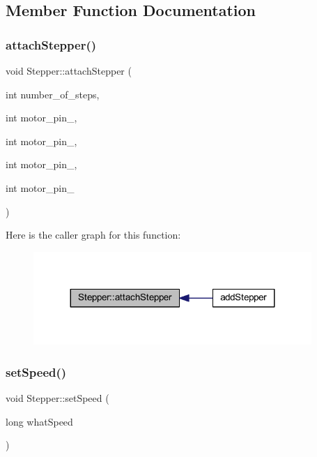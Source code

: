 \subsection{Member Function Documentation}
\mbox{\label{class_stepper_a3f68ee9b26d4076133ebfe070ec0b37c}} 
\subsubsection{\texorpdfstring{attach\+Stepper()}{attachStepper()}}
{\footnotesize\ttfamily void Stepper\+::attach\+Stepper (\begin{DoxyParamCaption}\item[{int}]{number\+\_\+of\+\_\+steps,  }\item[{int}]{motor\+\_\+pin\+\_,  }\item[{int}]{motor\+\_\+pin\+\_,  }\item[{int}]{motor\+\_\+pin\+\_,  }\item[{int}]{motor\+\_\+pin\+\_ }\end{DoxyParamCaption})}

Here is the caller graph for this function\+:\nopagebreak
\begin{figure}[H]
\begin{center}
\leavevmode
\includegraphics[width=299pt]{class_stepper_a3f68ee9b26d4076133ebfe070ec0b37c_icgraph}
\end{center}
\end{figure}
\mbox{\label{class_stepper_a89a1f8b30656437bba8732721d5671e2}} 
\subsubsection{\texorpdfstring{set\+Speed()}{setSpeed()}}
{\footnotesize\ttfamily void Stepper\+::set\+Speed (\begin{DoxyParamCaption}\item[{long}]{what\+Speed }\end{DoxyParamCaption})}

